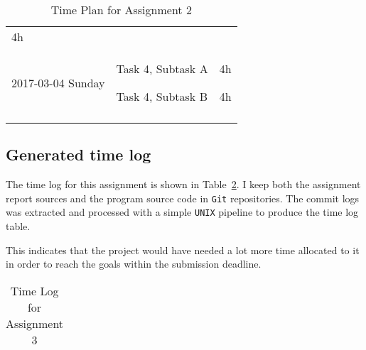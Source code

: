\begin{longtable}[c]{@{}lll@{}}
\begin{minipage}[t]{0.32\columnwidth}
4h
\strut\end{minipage}\tabularnewline
\begin{minipage}[t]{0.28\columnwidth}\raggedright\strut
2017-03-04 Sunday
\strut\end{minipage} &
\begin{minipage}[t]{0.25\columnwidth}\raggedright\strut
Task 4, Subtask A

Task 4, Subtask B
\strut\end{minipage} &
\begin{minipage}[t]{0.32\columnwidth}\raggedright\strut
4h

4h
\strut\end{minipage}\tabularnewline
\bottomrule
  \caption{Time Plan for Assignment 2}
  \label{table-timeplan}
\end{longtable}




\subsection{Generated time log}\label{time-log-result}

The time log for this assignment is shown in Table~\ref{table-timelog}.  I keep
both the assignment report \latex sources and the program source code in
\texttt{Git} repositories. The commit logs was extracted and processed with a
simple \texttt{UNIX} pipeline to produce the time log table.

This indicates that the project would have needed a lot more time allocated to
it in order to reach the goals within the submission deadline. 



\begin{table}[]
  \centering
  \begin{tabular}{@{}l|l|l}
    \toprule


    

  \end{tabular}
  \caption{Time Log for Assignment 3}
  \label{table-timelog}
\end{table}

